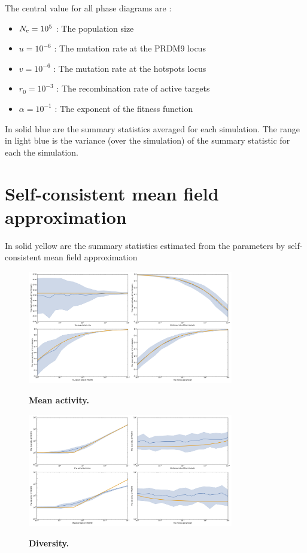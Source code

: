 \documentclass{article}
\begin{document}
The central value for all phase diagrams are :
\begin{itemize}
\item $N_\mathrm{e}=10^{5}$ : The population size
\item $u=10^{-6}$ : The mutation rate at the PRDM9 locus
\item $v=10^{-6}$ : The mutation rate at the hotspots locus
\item $r_0=10^{-3}$ : The recombination rate of active targets
\item $\alpha=10^{-1}$ : The exponent of the fitness function
\end{itemize}

In solid blue are the summary statistics averaged for each simulation.
The range in light blue is the variance (over the simulation) of the summary statistic for each the simulation.

\clearpage

\section*{Self-consistent mean field approximation}
In solid yellow are the summary statistics estimated from the parameters by self-consistent mean field approximation
\begin{figure}[!ht]
	  \centering
       \includegraphics[width=0.8\textwidth]{Images/mean-field-mean-activity.pdf}\\
		\caption{ \textbf{ Mean activity.} 
}
\end{figure}

\begin{figure}[!ht]
	  \centering
       \includegraphics[width=0.8\textwidth]{Images/mean-field-prdm9-diversity.pdf}\\
		\caption{ \textbf{ Diversity.} 
}
\end{figure}
\end{document}
